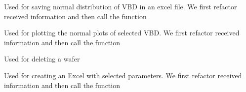 \documentclass[letterpaper,10pt,english]{sphinxmanual}
\begin{document}

\begin{fulllineitems}
\label{\detokenize{app:app.VBD_excel_normal}}
\pysigstartsignatures
{}
\pysigstopsignatures
\sphinxAtStartPar
Used for saving normal distribution of VBD in an excel file.
We first refactor received information and then call the function

\end{fulllineitems}


\begin{fulllineitems}
\label{\detokenize{app:app.VBD_normal}}
\pysigstartsignatures
{}
\pysigstopsignatures
\sphinxAtStartPar
Used for plotting the normal plots of selected VBD.
We first refactor received information and then call the function

\end{fulllineitems}


\begin{fulllineitems}
\label{\detokenize{app:app.delete_wafer}}
\pysigstartsignatures
{}
\pysigstopsignatures
\sphinxAtStartPar
Used for deleting a wafer

\end{fulllineitems}


\begin{fulllineitems}
\label{\detokenize{app:app.excel_structure_route}}
\pysigstartsignatures
{}
\pysigstopsignatures
\sphinxAtStartPar
Used for creating an Excel with selected parameters. We first refactor received information and then call the function

\end{fulllineitems}
\end{document}

